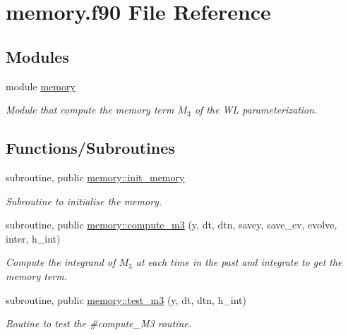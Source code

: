 \hypertarget{memory_8f90}{}\section{memory.\+f90 File Reference}
\label{memory_8f90}
\subsection*{Modules}
\begin{DoxyCompactItemize}
\item 
module \hyperlink{namespacememory}{memory}
\begin{DoxyCompactList}\small\item\em Module that compute the memory term $M_3$ of the WL parameterization. \end{DoxyCompactList}\end{DoxyCompactItemize}
\subsection*{Functions/\+Subroutines}
\begin{DoxyCompactItemize}
\item 
subroutine, public \hyperlink{namespacememory_ab130f53c70f8b6e46e81ce851a1cdce1}{memory\+::init\+\_\+memory}
\begin{DoxyCompactList}\small\item\em Subroutine to initialise the memory. \end{DoxyCompactList}\item 
subroutine, public \hyperlink{namespacememory_a76521fb2ecada5d623e947547314a5d6}{memory\+::compute\+\_\+m3} (y, dt, dtn, savey, save\+\_\+ev, evolve, inter, h\+\_\+int)
\begin{DoxyCompactList}\small\item\em Compute the integrand of $M_3$ at each time in the past and integrate to get the memory term. \end{DoxyCompactList}\item 
subroutine, public \hyperlink{namespacememory_a47338910873d83feb93ce970b45f8ed7}{memory\+::test\+\_\+m3} (y, dt, dtn, h\+\_\+int)
\begin{DoxyCompactList}\small\item\em Routine to test the \#compute\+\_\+\+M3 routine. \end{DoxyCompactList}\end{DoxyCompactItemize}
